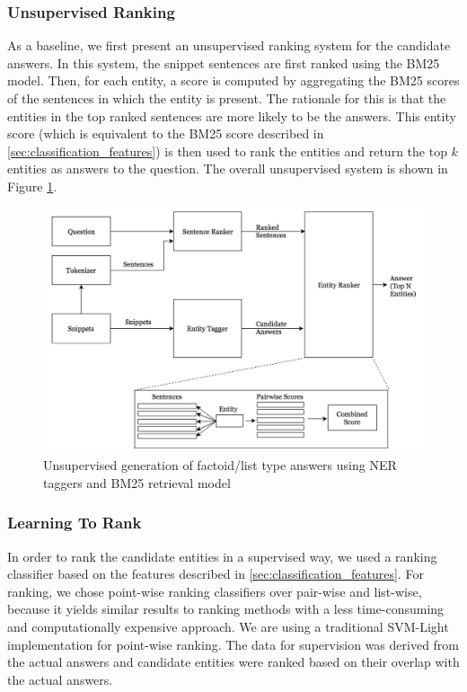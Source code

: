 \documentclass[11pt,a4paper]{article}
\begin{document}
\subsubsection{Unsupervised Ranking}

As a baseline, we first present an unsupervised ranking system for the candidate answers. In this system, the snippet sentences are first ranked using the BM25 model. Then, for each entity, a score is computed by aggregating the BM25 scores of the sentences in which the entity is present. The rationale for this is that the entities in the top ranked sentences are more likely to be the answers. This entity score (which is equivalent to the BM25 score described in \ref{sec:classification_features}) is then used to rank the entities and return the top $k$ entities as answers to the question. The overall unsupervised system is shown in Figure \ref{fig:UnsupervisedNERPipeline}.

\begin{figure}
    \centering
    \includegraphics[scale=0.4]{UnsupervisedNERPipeline.png}
    \caption{Unsupervised generation of factoid/list type answers using NER taggers and BM25 retrieval model}
    \label{fig:UnsupervisedNERPipeline}
\end{figure}

\subsubsection{Learning To Rank}

In order to rank the candidate entities in a supervised way, we used a ranking classifier based on the features described in \ref{sec:classification_features}. For ranking, we chose point-wise ranking classifiers over pair-wise and list-wise, because it yields similar results to ranking methods with a less time-consuming and computationally expensive approach. We are using a traditional SVM-Light \cite{svmlight} implementation for point-wise ranking. The data for supervision was derived from the actual answers and candidate entities were ranked based on their overlap with the actual answers. 
\end{document}
